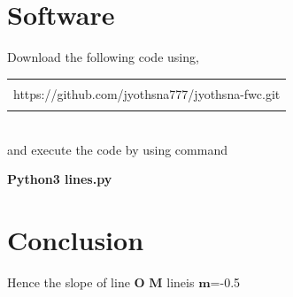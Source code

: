 \documentclass[journal,12pt,twocolumn]{IEEEtran}
\let\vec\mathbf
\begin{document}
\section{Software}
Download the following code using,
\begin{table}[h]
    \centering
    \begin{tabular}{|c|}
    \hline \\
   https://github.com/jyothsna777/jyothsna-fwc.git  \\
         \\
\hline
    \end{tabular}
\end{table}
\\
and execute the code by using command
\begin{center}
\textbf{Python3 lines.py}\\
\end{center}

\section{Conclusion}
Hence the slope of line $\vec{O}$ $\vec{M}$ lineis $\vec{m}$=-0.5
\end{document}
